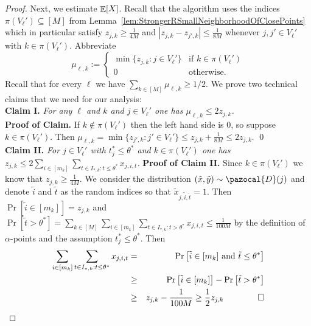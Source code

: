 \begin{proof}
  Next, we estimate $\mathop{\mathbb{E}}[X]$. Recall that the algorithm uses the indices $\pi(V_{\ell}') \subseteq [M]$ from Lemma~\ref{lem:StrongerRSmallNeighborhoodOfClosePoints} 
  which in particular satisfy $z_{j,k} \geq \frac{1}{4M}$ and $|z_{j,k}-z_{j',k}| \leq \frac{1}{8M}$ whenever $j,j' \in V_{\ell}'$ with $k \in \pi(V_{\ell}')$.
  Abbreviate
  \[
    \mu_{\ell,k} := \begin{cases} \min\{ z_{j,k} : j \in V_{\ell}' \} & \textrm{if }k \in \pi(V_{\ell}') \\
      0 & \textrm{otherwise.} \end{cases}
  \]
  Recall that for every $\ell$ we have $\sum_{k \in [M]} \mu_{\ell,k} \geq 1/2$. We prove two technical claims that we need for our analysis: \\
  {\bf Claim I.} \emph{For any $\ell$ and $k$ and $j \in V_{\ell}'$ one has $\mu_{\ell,k} \leq 2z_{j,k}$.} \\
  {\bf Proof of Claim.} If $k \notin \pi(V_{\ell}')$ then the left hand side is 0, so suppose  $k \in \pi(V_{\ell}')$. Then $\mu_{\ell,k} = \min\{ z_{j',k} : j' \in V_{\ell}'\} \leq z_{j,k} + \frac{1}{8M} \leq 2z_{j,k}$. \qed \\
  {\bf Claim II.} \emph{For $j \in V_{\ell}'$ with $t_j^* \leq \theta^*$ and $k \in \pi(V_{\ell}')$ one has $z_{j,k} \leq 2 \sum_{i \in [m_k]} \sum_{t \in I_{*,k}: t \leq \theta^*} x_{j,i,t}$.}
  {\bf Proof of Claim II.} Since $k \in \pi(V_{\ell}')$ we know that $z_{j,k} \geq \frac{1}{4M}$.
  We consider the distribution $(\tilde{x},\tilde{y}) \sim \pazocal{D}(j)$ and denote $\tilde{i}$ and $\tilde{t}$ as the random indices so that $\tilde{x}_{j,\tilde{i},\tilde{t}}=1$. Then $\Pr[\tilde{i} \in [m_k]] = z_{j,k}$ and $\Pr[\tilde{t} > \theta^*] = \sum_{k \in [M]} \sum_{i \in [m_k]} \sum_{t \in I_{*,k}: t > \theta^*} x_{j,i,t} \leq \frac{1}{100M}$ by the definition of $\alpha$-points and the assumption $t_{j}^* \leq \theta^*$. Then
  \begin{eqnarray*}
    \sum_{i \in [m_k]} \sum_{t \in I_{*,k}: t \leq \theta^*} x_{j,i,t} &=& \Pr\big[\tilde{i} \in [m_k]\textrm{ and }\tilde{t} \leq \theta^*\big] \\
    &\geq&  \Pr\big[\tilde{i} \in [m_k]\big] - \Pr\big[\tilde{t} > \theta^*\big] \\
    &\geq& z_{j,k} - \frac{1}{100M} \geq \frac{1}{2}z_{j,k} \quad \quad \qed
  \end{eqnarray*}
  

\end{proof}
